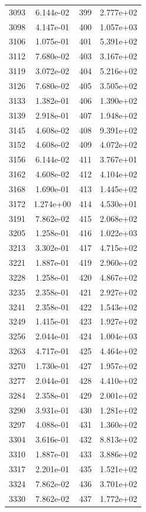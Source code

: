\documentclass[12pt]{article}
\begin{document}
\begin{longtable}{@{}cccc@{}}
3093 & 6.144e-02 & 399 & 2.777e+02 \\
3098 & 4.147e-01 & 400 & 1.057e+03 \\
3106 & 1.075e-01 & 401 & 5.391e+02 \\
3112 & 7.680e-02 & 403 & 3.167e+02 \\
3119 & 3.072e-02 & 404 & 5.216e+02 \\
3126 & 7.680e-02 & 405 & 3.505e+02 \\
3133 & 1.382e-01 & 406 & 1.390e+02 \\
3139 & 2.918e-01 & 407 & 1.948e+02 \\
3145 & 4.608e-02 & 408 & 9.391e+02 \\
3152 & 4.608e-02 & 409 & 4.072e+02 \\
3156 & 6.144e-02 & 411 & 3.767e+01 \\
3162 & 4.608e-02 & 412 & 4.104e+02 \\
3168 & 1.690e-01 & 413 & 1.445e+02 \\
3172 & 1.274e+00 & 414 & 4.530e+01 \\
3191 & 7.862e-02 & 415 & 2.068e+02 \\
3205 & 1.258e-01 & 416 & 1.022e+03 \\
3213 & 3.302e-01 & 417 & 4.715e+02 \\
3221 & 1.887e-01 & 419 & 2.960e+02 \\
3228 & 1.258e-01 & 420 & 4.867e+02 \\
3235 & 2.358e-01 & 421 & 2.927e+02 \\
3241 & 2.358e-01 & 422 & 1.543e+02 \\
3249 & 1.415e-01 & 423 & 1.927e+02 \\
3256 & 2.044e-01 & 424 & 1.004e+03 \\
3263 & 4.717e-01 & 425 & 4.464e+02 \\
3270 & 1.730e-01 & 427 & 1.957e+02 \\
3277 & 2.044e-01 & 428 & 4.410e+02 \\
3284 & 2.358e-01 & 429 & 2.001e+02 \\
3290 & 3.931e-01 & 430 & 1.281e+02 \\
3297 & 4.088e-01 & 431 & 1.360e+02 \\
3304 & 3.616e-01 & 432 & 8.813e+02 \\
3310 & 1.887e-01 & 433 & 3.886e+02 \\
3317 & 2.201e-01 & 435 & 1.521e+02 \\
3324 & 7.862e-02 & 436 & 3.701e+02 \\
3330 & 7.862e-02 & 437 & 1.772e+02 \\

\end{longtable}
\end{document}
